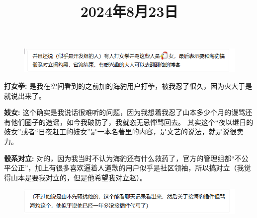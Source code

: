 \documentclass[10pt, letterpaper, twocolumn]{IEEEtran}
\begin{document}
\title{2024年8月23日}
\author{
\IEEEauthorblockA{}}
\maketitle

\begin{figure}[ht]
\centering
\includegraphics[width=0.8\columnwidth]{image/image1.png}
\label{fig:example}
\end{figure}

\textbf{打女拳:} 是我在空间看到的之前加的海豹用户打拳，被我忍了很久，因为火大于是就说出来了。

\textbf{妓女:} 这个确实是我说话很难听的问题，因为我想着我忍了山本多少个月的谩骂还有他们圈子的造谣，如今我破防了，我就恣无忌惮骂回去。
其实这个“夜以继日的妓女”或者“日夜赶工的妓女”是一本名著里的内容，是文艺的说法，就是说很卖力。


\textbf{骰系对立:} 对的，因为我当时不认为海豹还有什么救药了，官方的管理组都“不公平公正”，加上有很多喜欢逼着人道歉的用户似乎是社区领袖，所以搞对立（我觉得山本是要我对立的，但是他希望我对立赵）。

\begin{figure}[ht]
    \centering
    \includegraphics[width=0.8\columnwidth]{image/image2.png}
    \label{fig:example}
    \end{figure}
\end{document}
